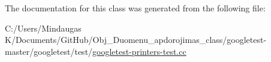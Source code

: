The documentation for this class was generated from the following file\+:\begin{DoxyCompactItemize}
\item 
C\+:/\+Users/\+Mindaugas K/\+Documents/\+Git\+Hub/\+Obj\+\_\+\+Duomenu\+\_\+apdorojimas\+\_\+class/googletest-\/master/googletest/test/\mbox{\hyperlink{googletest-master_2googletest_2test_2googletest-printers-test_8cc}{googletest-\/printers-\/test.\+cc}}\end{DoxyCompactItemize}
